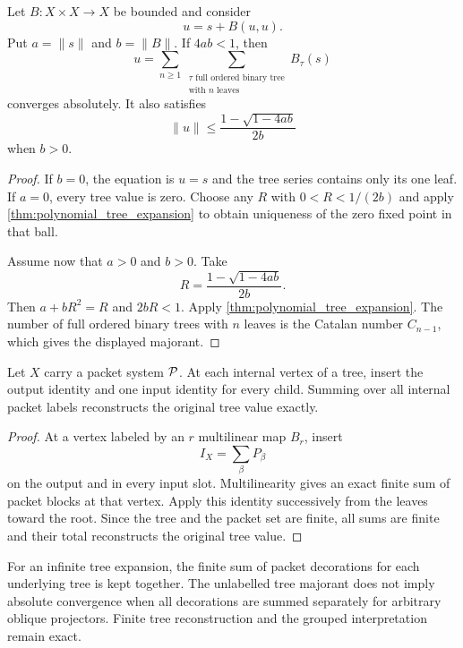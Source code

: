 \begin{corollary}\label{cor:quadratic_tree_expansion}
Let $B:X\times X\to X$ be bounded and consider
\[
u=s+B(u,u).
\]
Put $a=\|s\|$ and $b=\|B\|$.  If $4ab<1$, then
\[
u=
\sum_{n\ge1}
\sum_{\substack{\tau\text{ full ordered binary tree}\\\text{with }n\text{ leaves}}}
B_\tau(s)
\]
converges absolutely.  It also satisfies
\[
\|u\|
\le
\frac{1-\sqrt{1-4ab}}{2b}
\]
when $b>0$.
\end{corollary}

\begin{proof}
If $b=0$, the equation is $u=s$ and the tree series contains only its one leaf.  If $a=0$, every tree value is zero.  Choose any $R$ with $0<R<1/(2b)$ and apply \cref{thm:polynomial_tree_expansion} to obtain uniqueness of the zero fixed point in that ball.

Assume now that $a>0$ and $b>0$.  Take
\[
R=
\frac{1-\sqrt{1-4ab}}{2b}.
\]
Then $a+bR^2=R$ and $2bR<1$.  Apply \cref{thm:polynomial_tree_expansion}.  The number of full ordered binary trees with $n$ leaves is the Catalan number $C_{n-1}$, which gives the displayed majorant.
\end{proof}

\begin{theorem}\label{thm:packet_tree_reconstruction}
Let $X$ carry a packet system $\mathcal P$.  At each internal vertex of a tree, insert the output identity and one input identity for every child.  Summing over all internal packet labels reconstructs the original tree value exactly.
\end{theorem}

\begin{proof}
At a vertex labeled by an $r$ multilinear map $B_r$, insert
\[
I_X=\sum_\beta P_\beta
\]
on the output and in every input slot.  Multilinearity gives an exact finite sum of packet blocks at that vertex.  Apply this identity successively from the leaves toward the root.  Since the tree and the packet set are finite, all sums are finite and their total reconstructs the original tree value.
\end{proof}

For an infinite tree expansion, the finite sum of packet decorations for each underlying tree is kept together. The unlabelled tree majorant does not imply absolute convergence when all decorations are summed separately for arbitrary oblique projectors. Finite tree reconstruction and the grouped interpretation remain exact.

